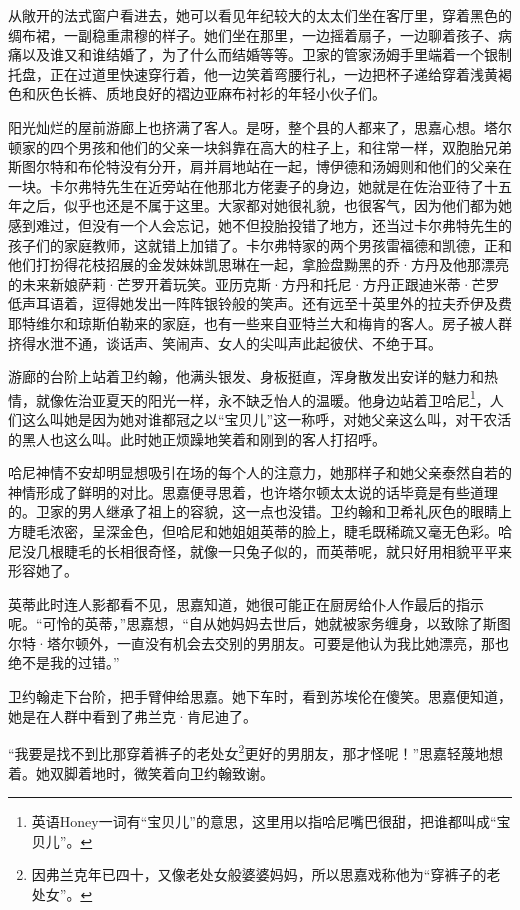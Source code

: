\par 从敞开的法式窗户看进去，她可以看见年纪较大的太太们坐在客厅里，穿着黑色的绸布裙，一副稳重肃穆的样子。她们坐在那里，一边摇着扇子，一边聊着孩子、病痛以及谁又和谁结婚了，为了什么而结婚等等。卫家的管家汤姆手里端着一个银制托盘，正在过道里快速穿行着，他一边笑着弯腰行礼，一边把杯子递给穿着浅黄褐色和灰色长裤、质地良好的褶边亚麻布衬衫的年轻小伙子们。
\par 阳光灿烂的屋前游廊上也挤满了客人。是呀，整个县的人都来了，思嘉心想。塔尔顿家的四个男孩和他们的父亲一块斜靠在高大的柱子上，和往常一样，双胞胎兄弟斯图尔特和布伦特没有分开，肩并肩地站在一起，博伊德和汤姆则和他们的父亲在一块。卡尔弗特先生在近旁站在他那北方佬妻子的身边，她就是在佐治亚待了十五年之后，似乎也还是不属于这里。大家都对她很礼貌，也很客气，因为他们都为她感到难过，但没有一个人会忘记，她不但投胎投错了地方，还当过卡尔弗特先生的孩子们的家庭教师，这就错上加错了。卡尔弗特家的两个男孩雷福德和凯德，正和他们打扮得花枝招展的金发妹妹凯思琳在一起，拿脸盘黝黑的乔·方丹及他那漂亮的未来新娘萨莉·芒罗开着玩笑。亚历克斯·方丹和托尼·方丹正跟迪米蒂·芒罗低声耳语着，逗得她发出一阵阵银铃般的笑声。还有远至十英里外的拉夫乔伊及费耶特维尔和琼斯伯勒来的家庭，也有一些来自亚特兰大和梅肯的客人。房子被人群挤得水泄不通，谈话声、笑闹声、女人的尖叫声此起彼伏、不绝于耳。
\par 游廊的台阶上站着卫约翰，他满头银发、身板挺直，浑身散发出安详的魅力和热情，就像佐治亚夏天的阳光一样，永不缺乏怡人的温暖。他身边站着卫哈尼\footnote{英语Honey一词有“宝贝儿”的意思，这里用以指哈尼嘴巴很甜，把谁都叫成“宝贝儿”。}，人们这么叫她是因为她对谁都冠之以“宝贝儿”这一称呼，对她父亲这么叫，对干农活的黑人也这么叫。此时她正烦躁地笑着和刚到的客人打招呼。
\par 哈尼神情不安却明显想吸引在场的每个人的注意力，她那样子和她父亲泰然自若的神情形成了鲜明的对比。思嘉便寻思着，也许塔尔顿太太说的话毕竟是有些道理的。卫家的男人继承了祖上的容貌，这一点也没错。卫约翰和卫希礼灰色的眼睛上方睫毛浓密，呈深金色，但哈尼和她姐姐英蒂的脸上，睫毛既稀疏又毫无色彩。哈尼没几根睫毛的长相很奇怪，就像一只兔子似的，而英蒂呢，就只好用相貌平平来形容她了。
\par 英蒂此时连人影都看不见，思嘉知道，她很可能正在厨房给仆人作最后的指示呢。“可怜的英蒂，”思嘉想，“自从她妈妈去世后，她就被家务缠身，以致除了斯图尔特·塔尔顿外，一直没有机会去交别的男朋友。可要是他认为我比她漂亮，那也绝不是我的过错。”
\par 卫约翰走下台阶，把手臂伸给思嘉。她下车时，看到苏埃伦在傻笑。思嘉便知道，她是在人群中看到了弗兰克·肯尼迪了。
\par “我要是找不到比那穿着裤子的老处女\footnote{因弗兰克年已四十，又像老处女般婆婆妈妈，所以思嘉戏称他为“穿裤子的老处女”。}更好的男朋友，那才怪呢！”思嘉轻蔑地想着。她双脚着地时，微笑着向卫约翰致谢。
